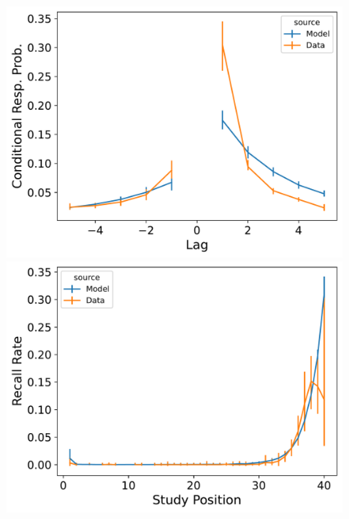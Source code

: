\documentclass[
  letterpaper,
  11pt,
  english,
  singlespacing,
  headsepline]{MastersDoctoralThesis}
\begin{document}
\begin{figure}
\begin{minipage}{0.33\linewidth}
\includegraphics{icmr_figures/Murdock1962_TraceScalingCMR_Model_Fitting_LL40_crp-1.png}\end{minipage}%
%
\begin{minipage}{0.33\linewidth}
\includegraphics{icmr_figures/Murdock1962_TraceScalingCMR_Model_Fitting_LL40_pnr-1.png}\end{minipage}%
%
\begin{minipage}{0.33\linewidth}

\end{minipage}
\end{figure}
\end{document}
